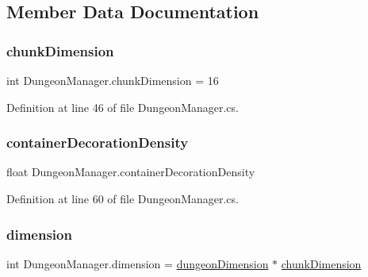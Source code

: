 \subsection{Member Data Documentation}
\mbox{\label{class_dungeon_manager_a36a67a913c6a4b58b2f32094c23df9e2}} 
\subsubsection{\texorpdfstring{chunkDimension}{chunkDimension}}
{\footnotesize\ttfamily int Dungeon\+Manager.\+chunk\+Dimension = 16\hspace{0.3cm}{\ttfamily [static]}}



Definition at line 46 of file Dungeon\+Manager.\+cs.

\mbox{\label{class_dungeon_manager_ac8121ec063d2906a27e427909dda7b98}} 
\subsubsection{\texorpdfstring{containerDecorationDensity}{containerDecorationDensity}}
{\footnotesize\ttfamily float Dungeon\+Manager.\+container\+Decoration\+Density}



Definition at line 60 of file Dungeon\+Manager.\+cs.

\mbox{\label{class_dungeon_manager_ae88e176f6ea28c2dfb59af8db9967e88}} 
\subsubsection{\texorpdfstring{dimension}{dimension}}
{\footnotesize\ttfamily int Dungeon\+Manager.\+dimension = \mbox{\hyperlink{class_dungeon_manager_ac2d375dcf35a5a62c98fce7bc6dd44e0}{dungeon\+Dimension}} $\ast$ \mbox{\hyperlink{class_dungeon_manager_a36a67a913c6a4b58b2f32094c23df9e2}{chunk\+Dimension}}\hspace{0.3cm}{\ttfamily [static]}}



